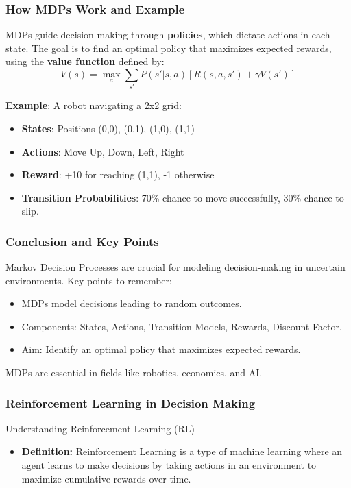 \documentclass[aspectratio=169]{beamer}
\begin{document}
\begin{frame}[fragile]
    \frametitle{How MDPs Work and Example}
    MDPs guide decision-making through \textbf{policies}, which dictate actions in each state.
    The goal is to find an optimal policy that maximizes expected rewards, using the \textbf{value function} defined by:
    \begin{equation}
        V(s) = \max_a \sum_{s'} P(s' | s, a) [R(s, a, s') + \gamma V(s')]
    \end{equation}

    \textbf{Example}: A robot navigating a 2x2 grid:
    \begin{itemize}
        \item \textbf{States}: Positions (0,0), (0,1), (1,0), (1,1)
        \item \textbf{Actions}: Move Up, Down, Left, Right
        \item \textbf{Reward}: +10 for reaching (1,1), -1 otherwise
        \item \textbf{Transition Probabilities}: 70\% chance to move successfully, 30\% chance to slip.
    \end{itemize}
\end{frame}

\begin{frame}[fragile]
    \frametitle{Conclusion and Key Points}
    Markov Decision Processes are crucial for modeling decision-making in uncertain environments. Key points to remember:
    \begin{itemize}
        \item MDPs model decisions leading to random outcomes.
        \item Components: States, Actions, Transition Models, Rewards, Discount Factor.
        \item Aim: Identify an optimal policy that maximizes expected rewards.
    \end{itemize}
    MDPs are essential in fields like robotics, economics, and AI.
\end{frame}

\begin{frame}[fragile]
    \frametitle{Reinforcement Learning in Decision Making}
    \begin{block}{Understanding Reinforcement Learning (RL)}
        \begin{itemize}
            \item \textbf{Definition:} 
            Reinforcement Learning is a type of machine learning where an agent learns to make decisions by taking actions in an environment to maximize cumulative rewards over time.
        \end{itemize}
    \end{block}
\end{frame}
\end{document}
